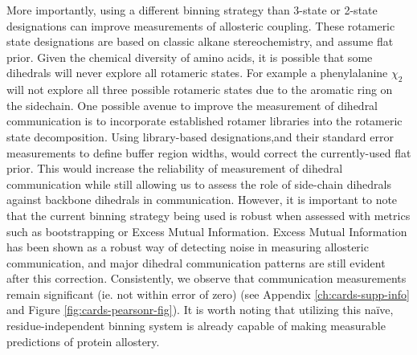 \documentclass[../main.tex]{subfiles}
\begin{document}
        More importantly, using a different binning strategy than 3-state or 2-state designations can improve measurements of allosteric coupling. These rotameric state designations are based on classic alkane stereochemistry, and assume flat prior. Given the chemical diversity of amino acids, it is possible that some dihedrals will never explore all rotameric states. For example a phenylalanine $\chi _{2}$ will not explore all three possible rotameric states due to the aromatic ring on the sidechain. One possible avenue to improve the measurement of dihedral communication is to incorporate established rotamer libraries into the rotameric state decomposition\cite{chaudhury_pyrosetta:_2010, shapovalov_smoothed_2011}. Using library-based designations,and their standard error measurements to define buffer region widths, would correct the currently-used flat prior. This would increase the reliability of measurement of dihedral communication while still allowing us to assess the role of side-chain dihedrals against backbone dihedrals in communication. However, it is important to note that the current binning strategy being used is robust when assessed with metrics such as bootstrapping or Excess Mutual Information. Excess Mutual Information has been shown as a robust way of detecting noise in measuring allosteric communication, and major dihedral communication patterns are still evident after this correction\cite{Bowman:2012jd}. Consistently, we observe that communication measurements remain significant (ie. not within error of zero) (see Appendix \ref{ch:cards-supp-info} and Figure \ref{fig:cards-pearsonr-fig}). It is worth noting that utilizing this naïve, residue-independent binning system is already capable of making measurable predictions of protein allostery\cite{Sun:2018kx,Cruz2020vp35}.
\end{document}
